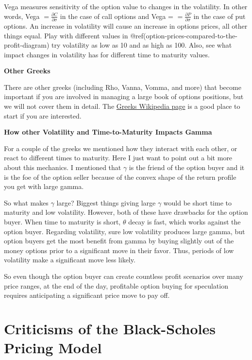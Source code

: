 \documentclass[
  letterpaper,
  DIV=11,
  numbers=noendperiod]{scrreprt}
\begin{document}
Vega measures sensitivity of the option value to changes in the
volatility. In other words, Vega
\(= \frac{\partial C}{\partial \sigma}\) in the case of call options and
Vega = \(= \frac{\partial P}{\partial \sigma}\) in the case of put
options. An increase in volatility will cause an increase in options
prices, all other things equal. Play with different values in
@ref(option-prices-compared-to-the-profit-diagram) try volatility as low
as 10 and as high as 100. Also, see what impact changes in volatility
has for different time to maturity values.

\textbf{Other Greeks}

There are other greeks (including Rho, Vanna, Vomma, and more) that
become important if you are involved in managing a large book of options
positions, but we will not cover them in detail. The
\href{https://en.wikipedia.org/wiki/Greeks_(finance)}{Greeks Wikipedia
page} is a good place to start if you are interested.

\textbf{How other Volatility and Time-to-Maturity Impacts Gamma}

For a couple of the greeks we mentioned how they interact with each
other, or react to different times to maturity. Here I just want to
point out a bit more about this mechanics. I mentioned that \(\gamma\)
is the friend of the option buyer and it is the foe of the option seller
because of the convex shape of the return profile you get with large
gamma.

So what makes \(\gamma\) large? Biggest things giving large \(\gamma\)
would be short time to maturity and low volatility. However, both of
these have drawbacks for the option buyer. When time to maturity is
short, \(\theta\) decay is fast, which works against the option buyer.
Regarding volatility, sure low volatility produces large gamma, but
option buyers get the most benefit from gamma by buying slightly out of
the money options prior to a significant move in their favor. Thus,
periods of low volatility make a significant move less likely.

So even though the option buyer can create countless profit scenarios
over many price ranges, at the end of the day, profitable option buying
for speculation requires anticipating a significant price move to pay
off.

\section{Criticisms of the Black-Scholes Pricing
Model}\label{criticisms-of-the-black-scholes-pricing-model}
\end{document}
